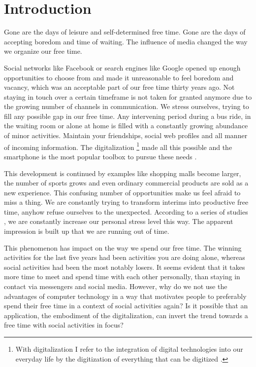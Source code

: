 \documentclass[12pt,numbers=noenddot,parskip,bibliography=totocnumbered,listof=totocnumbered,draft]{scrreprt}
\begin{document}
\chapter{Introduction}
Gone are the days of leisure and self-determined free time. Gone are the days of accepting boredom and time of waiting. The influence of media changed the way we organize our free time.  

Social networks like Facebook or search engines like Google opened up enough opportunities to choose from and made it unreasonable to feel boredom and vacancy, which was an acceptable part of our free time thirty years ago. Not staying in touch over a certain timeframe is not taken for granted anymore due to the growing number of channels in communication. We stress ourselves, trying to fill any possible gap in our free time. Any intervening period during a bus ride, in the waiting room or alone at home is filled with a constantly growing abundance of minor activities. Maintain your friendships, social web profiles and all manner of incoming information. The digitalization \footnote{With digitalization I refer to the integration of digital technologies into our everyday life by the digitization of everything that can be digitized \citep{digitalization}.} made all this possible and the smartphone is the most popular toolbox to pursue these needs \citep[p.213]{destatis2017}.

This development is continued by examples like shopping malls become larger, the number of sports grows and even ordinary commercial products are sold as a new experience. This confusing number of opportunities make us feel afraid to miss a thing. We are constantly trying to transform interims into productive free time, anyhow refuse ourselves to the unexpected. According to a series of studies \citep[p. 14]{freizeitmonitor2016}, we are constantly increase our personal stress level this way. The apparent impression is built up that we are running out of time. 

This phenomenon has impact on the way we spend our free time. The winning activities for the last five years had been activities you are doing alone, whereas social activities had been the most notably losers. It seems evident that it takes more time to meet and spend time with each other personally, than staying in contact via messengers and social media. However, why do we not use the advantages of computer technology in a way that motivates people to preferably spend their free time in a context of social activities again? Is it possible that an application, the embodiment of the digitalization, can invert the trend towards a free time with social activities in focus? %
\end{document}
